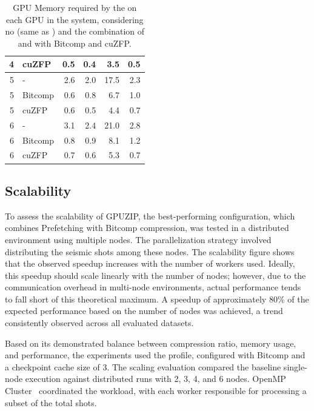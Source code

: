 \documentclass[Ingles,Final]{ic-tese-v3}
\begin{document}
\begin{table}[h!]
\begin{tabular}{|r|l|r|r|r|r|}
\rowcolor[HTML]{EFEFEF} 
4 & cuZFP   & 0.5 & 0.4 & 3.5  & 0.5 \\ \hline
5 & -       & 2.6 & 2.0 & 17.5 & 2.3 \\ \hline
5 & Bitcomp & 0.6 & 0.8 & 6.7  & 1.0 \\ \hline
5 & cuZFP   & 0.6 & 0.5 & 4.4  & 0.7 \\ \hline
\rowcolor[HTML]{EFEFEF} 
6 & -       & 3.1 & 2.4 & 21.0 & 2.8 \\ \hline
\rowcolor[HTML]{EFEFEF} 
6 & Bitcomp & 0.8 & 0.9 & 8.1  & 1.2 \\ \hline
\rowcolor[HTML]{EFEFEF} 
6 & cuZFP   & 0.7 & 0.6 & 5.3  & 0.7 \\ \hline
\end{tabular}
\caption[Memory consumption analysis (\checkpointprefetching + \compression)]{GPU Memory required by the \cache on each GPU in the system, considering no \compression (same as ) and the combination of \checkpointprefetching and \compression with Bitcomp and cuZFP.}
\label{tab:prefcomp_mem}
\end{table}


\subsection{Scalability}
\label{sec:comppref_scalability}

To assess the scalability of GPUZIP, the best-performing configuration, which combines Prefetching with Bitcomp compression, was tested in a distributed environment using multiple nodes. The parallelization strategy involved distributing the seismic shots among these nodes. The scalability figure shows that the observed speedup increases with the number of workers used. Ideally, this speedup should scale linearly with the number of nodes; however, due to the communication overhead in multi-node environments, actual performance tends to fall short of this theoretical maximum. A speedup of approximately 80\% of the expected performance based on the number of nodes was achieved, a trend consistently observed across all evaluated datasets.

Based on its demonstrated balance between compression ratio, memory usage, and performance, the experiments used the \revolve profile, configured with Bitcomp and a checkpoint cache size of 3. The scaling evaluation compared the baseline single-node execution against distributed runs with 2, 3, 4, and 6 nodes. OpenMP Cluster~\cite{ompc} coordinated the workload, with each worker responsible for processing a subset of the total shots.
\end{document}
